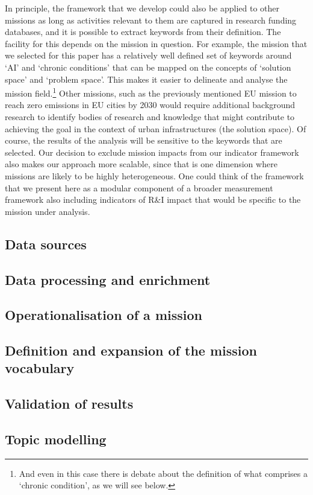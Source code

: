 \documentclass[11pt]{article}
\begin{document}
In principle, the framework that we develop could also be applied to other missions as long as activities relevant to them are captured in research funding databases, and it is possible to extract keywords from their definition. The facility for this depends on the mission in question. For example, the mission that we selected for this paper has a relatively well defined set of keywords around `AI’ and `chronic conditions’ that can be mapped on the concepts of ‘solution space’ and ‘problem space’. This makes it easier to delineate and analyse the mission field.\footnote{And even in this case there is debate about the definition of what comprises a `chronic condition’, as we will see below.} Other missions, such as the previously mentioned EU mission to reach zero emissions in EU cities by 2030 would require additional background research to identify bodies of research and knowledge that might contribute to achieving the goal in the context of urban infrastructures (the solution space). Of course, the results of the analysis will be sensitive to the keywords that are selected. Our decision to exclude mission impacts from our indicator framework also makes our approach more scalable, since that is one dimension where missions are likely to be highly heterogeneous. One could think of the framework that we present here as a modular component of a broader measurement framework also including indicators of R&I impact that would be specific to the mission under analysis.


\subsection{Data sources}
\subsection{Data processing and enrichment}
\subsection{Operationalisation of a mission}
\subsection{Definition and expansion of the mission vocabulary}
\subsection{Validation of results}
\subsection{Topic modelling}
\end{document}
